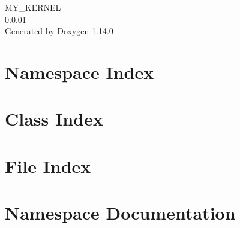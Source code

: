 \documentclass[twoside]{book}
\newcommand{\+}{\discretionary{\mbox{\scriptsize$\hookleftarrow$}}{}{}}
\newcommand{\clearemptydoublepage}{%
    \newpage{\pagestyle{empty}\cleardoublepage}%
  }
\begin{document}
  \raggedbottom
    \hypersetup{pageanchor=false,
                bookmarksnumbered=true,
                pdfencoding=unicode
               }
  \begin{titlepage}
  \vspace*{7cm}
  \begin{center}%
  {\Large MY\+\_\+\+KERNEL}\\
  [1ex]\large 0.\+0.\+01 \\
  \vspace*{1cm}
  {\large Generated by Doxygen 1.14.0}\\
  \end{center}
  \end{titlepage}
  \clearemptydoublepage
  \tableofcontents
  \clearemptydoublepage
  \hypersetup{pageanchor=true}
\chapter{Namespace Index}

\chapter{Class Index}

\chapter{File Index}

\chapter{Namespace Documentation}







\end{document}
